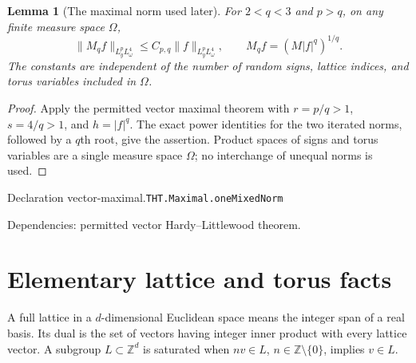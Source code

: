 \documentclass[11pt]{article}
\newtheorem{lemma}[theorem]{Lemma}
\theoremstyle{definition}
\newcommand{\Z}{\mathbb Z}
\numberwithin{equation}{section}
\newcommand{\bp}[3]{\par\smallskip\begingroup\footnotesize
\noindent\hypertarget{bp:#1}{\textsf{Declaration #1.}}\quad\nolinkurl{#2}\par
\noindent\textsf{Dependencies:} #3.\par\endgroup\smallskip}
\begin{document}
\begin{lemma}[The maximal norm used later]\label{lem:vector-maximal}
For $2<q<3$ and $p>q$, on any finite measure space $\Omega$,
\[
 \|M_q f\|_{L_y^pL_\omega^4}\le C_{p,q}\|f\|_{L_y^pL_\omega^4},
 \qquad M_qf=(M|f|^q)^{1/q}.
\]
The constants are independent of the number of random signs, lattice indices, and torus variables included in $\Omega$.
\end{lemma}
\begin{proof}
Apply the permitted vector maximal theorem with $r=p/q>1$, $s=4/q>1$, and $h=|f|^q$. The exact power identities for the two iterated norms, followed by a $q$th root, give the assertion. Product spaces of signs and torus variables are a single measure space $\Omega$; no interchange of unequal norms is used.
\end{proof}
\bp{vector-maximal}{THT.Maximal.oneMixedNorm}{permitted vector Hardy--Littlewood theorem}


\section{Elementary lattice and torus facts}\label{sec:lattices}
A full lattice in a $d$-dimensional Euclidean space means the integer span of a real basis. Its dual is the set of vectors having integer inner product with every lattice vector. A subgroup $L\subset\Z^d$ is saturated when $nv\in L$, $n\in\Z\setminus\{0\}$, implies $v\in L$.
\end{document}

